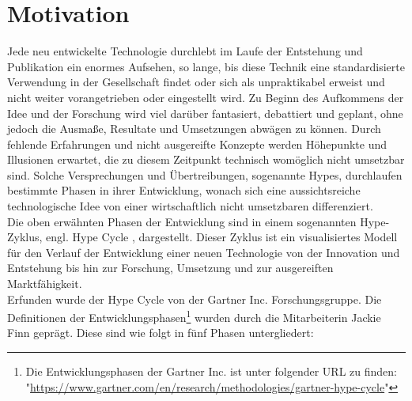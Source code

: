 \section{Motivation}
\label{sec:Motivation}
    Jede neu entwickelte Technologie durchlebt im Laufe der Entstehung und Publikation ein enormes Aufsehen, 
    so lange, bis diese Technik eine standardisierte Verwendung in der Gesellschaft findet oder sich als 
    unpraktikabel erweist und nicht weiter vorangetrieben oder eingestellt wird. Zu Beginn des Aufkommens der Idee 
    und der Forschung wird viel darüber fantasiert, debattiert und geplant, ohne jedoch die Ausmaße, Resultate und 
    Umsetzungen abwägen zu können. Durch fehlende Erfahrungen und nicht ausgereifte 
    Konzepte werden Höhepunkte und Illusionen erwartet, die zu diesem Zeitpunkt technisch womöglich nicht umsetzbar sind. 
    Solche Versprechungen und Übertreibungen, sogenannte Hypes, durchlaufen bestimmte Phasen in ihrer Entwicklung, wonach 
    sich eine aussichtsreiche technologische Idee von einer wirtschaftlich nicht umsetzbaren differenziert. 
    \\
    \linebreak
    Die oben erwähnten Phasen der Entwicklung sind in einem sogenannten Hype-Zyklus, engl. Hype Cycle \cite{gartner.2022m}, dargestellt. 
    Dieser Zyklus ist ein visualisiertes Modell für den Verlauf der Entwicklung einer neuen Technologie von der Innovation 
    und Entstehung bis hin zur Forschung, Umsetzung und zur ausgereiften Marktfähigkeit. 
    \\
    Erfunden wurde der Hype Cycle von der Gartner Inc. Forschungsgruppe. Die Definitionen der 
    Entwicklungsphasen\footnote{Die Entwicklungsphasen der Gartner Inc. ist unter folgender URL zu finden: "\url{https://www.gartner.com/en/research/methodologies/gartner-hype-cycle}"} 
    wurden durch die Mitarbeiterin Jackie Finn geprägt. Diese sind wie folgt in fünf Phasen untergliedert: 
